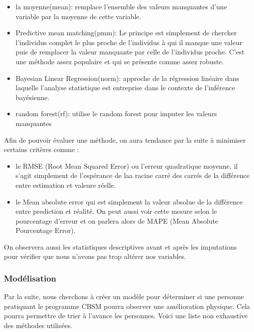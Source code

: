 \documentclass[]{article}
\providecommand{\tightlist}{%
  \setlength{\itemsep}{0pt}\setlength{\parskip}{0pt}}
\begin{document}
\begin{itemize}
\tightlist
\item
  la moyenne(mean): remplace l'ensemble des valeurs manquantes d'une
  variable par la moyenne de cette variable.
\item
  Predictive mean matching(pmm): Le principe est simplement de chercher
  l'individus complet le plus proche de l'individus à qui il manque une
  valeur puis de remplacer la valeur manquante par celle de l'individus
  proche. C'est une méthode assez populaire et qui se présente comme
  assez robuste.
\item
  Bayesian Linear Regression(norm): approche de la régression linéaire
  dans laquelle l'analyse statistique est entreprise dans le contexte de
  l'inférence bayésienne.
\item
  random forest(rf): utilise le random forest pour imputer les valeurs
  manquantes
\end{itemize}

Afin de pouvoir évaluer une méthode, on aura tendance par la suite à
minimiser certains critères comme :

\begin{itemize}
\tightlist
\item
  le RMSE (Root Mean Squared Error) ou l'erreur quadratique moyenne, il
  s'agit simplement de l'espérance de laa racine carré des carrés de la
  différence entre estimation et valeure réelle.
\item
  le Mean absolute error qui est simplement la valeur absolue de la
  différence entre prediction et réalité. On peut aussi voir cette
  mesure selon le pourcentage d'erreur et on parlera alors de MAPE (Mean
  Absolute Pourcentage Error).
\end{itemize}

On observera aussi les statistiques descriptives avant et après les
imputations pour vérifier que nous n'avons pas trop altérer nos
variables.

\hypertarget{moduxe9lisation}{%
\subsubsection{Modélisation}\label{moduxe9lisation}}

Par la suite, nous cherchons à créer un modèle pour déterminer si une
personne pratiquant le programme CBSM pourra observer une amélioration
physique. Cela pourra permettre de trier à l'avance les personnes. Voici
une liste non exhaustive des méthodes utilisées.
\end{document}
